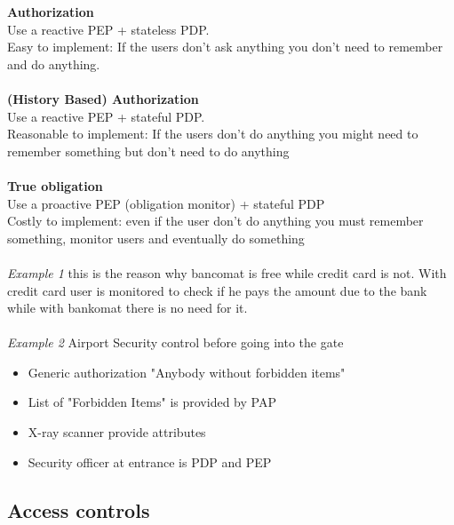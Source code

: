 \documentclass[10pt,a4paper]{book}
\begin{document}
\textbf{Authorization}\\
Use a reactive PEP + stateless PDP.\\
Easy to implement: If the users don't ask anything you don't need to remember and do anything.\\\\
\textbf{(History Based) Authorization}\\
Use a reactive PEP + stateful PDP.\\
Reasonable to implement: If the users don't do anything you might need to remember something but don't need to do anything\\\\
\textbf{True obligation}\\
Use a proactive PEP (obligation monitor) + stateful PDP\\
Costly to implement: even if the user don't do anything you must remember something, monitor users and eventually do something\\\\
\emph{Example 1} this is the reason why bancomat is free while credit card is not. With credit card user is monitored to check if he pays the amount due to the bank while with bankomat there is no need for it.\\\\
\emph{Example 2} Airport Security control before going into the gate
\begin{itemize}
\item Generic authorization "Anybody without forbidden items"
\item List of "Forbidden Items" is provided by PAP
\item X-ray scanner provide attributes
\item Security officer at entrance is PDP and PEP
\end{itemize}

\subsection{Access controls}
\end{document}
